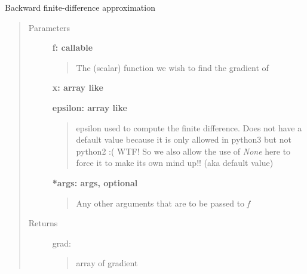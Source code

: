 \documentclass[letterpaper,10pt,english]{sphinxmanual}
\begin{document}
\begin{fulllineitems}
Backward finite-difference approximation
\begin{quote}\begin{description}
\item[{Parameters}] \leavevmode
\textbf{f: callable}
\begin{quote}

The (scalar) function we wish to find the gradient of
\end{quote}

\textbf{x: array like}

\textbf{epsilon: array like}
\begin{quote}

epsilon used to compute the finite difference.  Does not 
have a default value because it is only allowed in 
python3 but not python2 :( WTF!  So we also allow the
use of \emph{None} here to force it to make its own mind
up!! (aka default value)
\end{quote}

\textbf{*args: args, optional}
\begin{quote}

Any other arguments that are to be passed to \emph{f}
\end{quote}

\item[{Returns}] \leavevmode
grad: \href{http://docs.scipy.org/doc/numpy/reference/generated/numpy.ndarray.html\#numpy.ndarray}{}
\begin{quote}

array of gradient
\end{quote}

\end{description}\end{quote}

\end{fulllineitems}
\end{document}
